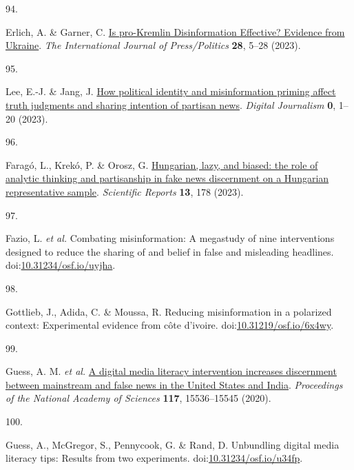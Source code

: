 \documentclass[
  man]{apa6}
\newlength{\cslhangindent}
\newlength{\csllabelwidth}
\newenvironment{CSLReferences}[2] %
 {\begin{list}{}{%
  \setlength{\itemindent}{0pt}
  \setlength{\leftmargin}{0pt}
  \setlength{\parsep}{0pt}
  \ifodd #1
   \setlength{\leftmargin}{\cslhangindent}
   \setlength{\itemindent}{-1\cslhangindent}
  \fi
  \setlength{\itemsep}{#2\baselineskip}}}
 {\end{list}}
\newcommand{\CSLLeftMargin}[1]{\parbox[t]{\csllabelwidth}{\strut#1\strut}}
\newcommand{\CSLRightInline}[1]{\parbox[t]{\linewidth - \csllabelwidth}{\strut#1\strut}}
\begin{document}
\begin{CSLReferences}{0}{0}
\CSLLeftMargin{94. }%
\CSLRightInline{*Erlich, A. \& Garner, C. \href{https://doi.org/10.1177/19401612211045221}{Is pro-Kremlin Disinformation Effective? Evidence from Ukraine}. \emph{The International Journal of Press/Politics} \textbf{28}, 5--28 (2023).}

\CSLLeftMargin{95. }%
\CSLRightInline{*Lee, E.-J. \& Jang, J. \href{https://doi.org/10.1080/21670811.2022.2163413}{How political identity and misinformation priming affect truth judgments and sharing intention of partisan news}. \emph{Digital Journalism} \textbf{0}, 1--20 (2023).}

\CSLLeftMargin{96. }%
\CSLRightInline{*Faragó, L., Krekó, P. \& Orosz, G. \href{https://doi.org/10.1038/s41598-022-26724-8}{Hungarian, lazy, and biased: the role of analytic thinking and partisanship in fake news discernment on a Hungarian representative sample}. \emph{Scientific Reports} \textbf{13}, 178 (2023).}

\CSLLeftMargin{97. }%
\CSLRightInline{*Fazio, L. \emph{et al.} Combating misinformation: A megastudy of nine interventions designed to reduce the sharing of and belief in false and misleading headlines. doi:\href{https://doi.org/10.31234/osf.io/uyjha}{10.31234/osf.io/uyjha}.}

\CSLLeftMargin{98. }%
\CSLRightInline{*Gottlieb, J., Adida, C. \& Moussa, R. Reducing misinformation in a polarized context: Experimental evidence from côte d{'}ivoire. doi:\href{https://doi.org/10.31219/osf.io/6x4wy}{10.31219/osf.io/6x4wy}.}

\CSLLeftMargin{99. }%
\CSLRightInline{*Guess, A. M. \emph{et al.} \href{https://doi.org/10.1073/pnas.1920498117}{A digital media literacy intervention increases discernment between mainstream and false news in the United States and India}. \emph{Proceedings of the National Academy of Sciences} \textbf{117}, 15536--15545 (2020).}

\CSLLeftMargin{100. }%
\CSLRightInline{*Guess, A., McGregor, S., Pennycook, G. \& Rand, D. Unbundling digital media literacy tips: Results from two experiments. doi:\href{https://doi.org/10.31234/osf.io/u34fp}{10.31234/osf.io/u34fp}.}


\end{CSLReferences}
\end{document}

